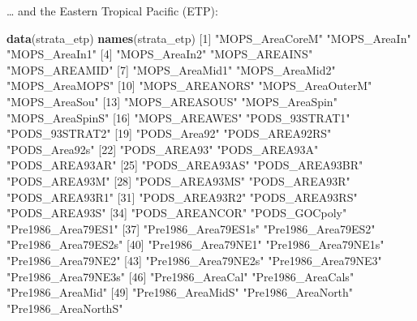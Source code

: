 \documentclass[
]{book}
\newenvironment{Shaded}{\begin{snugshade}}{\end{snugshade}}
\newcommand{\DecValTok}[1]{\textcolor[rgb]{0.00,0.00,0.81}{#1}}
\newcommand{\FunctionTok}[1]{\textcolor[rgb]{0.13,0.29,0.53}{\textbf{#1}}}
\newcommand{\NormalTok}[1]{#1}
\newcommand{\StringTok}[1]{\textcolor[rgb]{0.31,0.60,0.02}{#1}}
\begin{document}
\ldots{} and the Eastern Tropical Pacific (ETP):

\begin{Shaded}
\begin{Highlighting}[]
\FunctionTok{data}\NormalTok{(strata\_etp) }
\FunctionTok{names}\NormalTok{(strata\_etp)}
\NormalTok{ [}\DecValTok{1}\NormalTok{] }\StringTok{"MOPS\_AreaCoreM"}     \StringTok{"MOPS\_AreaIn"}        \StringTok{"MOPS\_AreaIn1"}      
\NormalTok{ [}\DecValTok{4}\NormalTok{] }\StringTok{"MOPS\_AreaIn2"}       \StringTok{"MOPS\_AREAINS"}       \StringTok{"MOPS\_AREAMID"}      
\NormalTok{ [}\DecValTok{7}\NormalTok{] }\StringTok{"MOPS\_AreaMid1"}      \StringTok{"MOPS\_AreaMid2"}      \StringTok{"MOPS\_AreaMOPS"}     
\NormalTok{[}\DecValTok{10}\NormalTok{] }\StringTok{"MOPS\_AREANORS"}      \StringTok{"MOPS\_AreaOuterM"}    \StringTok{"MOPS\_AreaSou"}      
\NormalTok{[}\DecValTok{13}\NormalTok{] }\StringTok{"MOPS\_AREASOUS"}      \StringTok{"MOPS\_AreaSpin"}      \StringTok{"MOPS\_AreaSpinS"}    
\NormalTok{[}\DecValTok{16}\NormalTok{] }\StringTok{"MOPS\_AREAWES"}       \StringTok{"PODS\_93STRAT1"}      \StringTok{"PODS\_93STRAT2"}     
\NormalTok{[}\DecValTok{19}\NormalTok{] }\StringTok{"PODS\_Area92"}        \StringTok{"PODS\_AREA92RS"}      \StringTok{"PODS\_Area92s"}      
\NormalTok{[}\DecValTok{22}\NormalTok{] }\StringTok{"PODS\_AREA93"}        \StringTok{"PODS\_AREA93A"}       \StringTok{"PODS\_AREA93AR"}     
\NormalTok{[}\DecValTok{25}\NormalTok{] }\StringTok{"PODS\_AREA93AS"}      \StringTok{"PODS\_AREA93BR"}      \StringTok{"PODS\_AREA93M"}      
\NormalTok{[}\DecValTok{28}\NormalTok{] }\StringTok{"PODS\_AREA93MS"}      \StringTok{"PODS\_AREA93R"}       \StringTok{"PODS\_AREA93R1"}     
\NormalTok{[}\DecValTok{31}\NormalTok{] }\StringTok{"PODS\_AREA93R2"}      \StringTok{"PODS\_AREA93RS"}      \StringTok{"PODS\_AREA93S"}      
\NormalTok{[}\DecValTok{34}\NormalTok{] }\StringTok{"PODS\_AREANCOR"}      \StringTok{"PODS\_GOCpoly"}       \StringTok{"Pre1986\_Area79ES1"} 
\NormalTok{[}\DecValTok{37}\NormalTok{] }\StringTok{"Pre1986\_Area79ES1s"} \StringTok{"Pre1986\_Area79ES2"}  \StringTok{"Pre1986\_Area79ES2s"}
\NormalTok{[}\DecValTok{40}\NormalTok{] }\StringTok{"Pre1986\_Area79NE1"}  \StringTok{"Pre1986\_Area79NE1s"} \StringTok{"Pre1986\_Area79NE2"} 
\NormalTok{[}\DecValTok{43}\NormalTok{] }\StringTok{"Pre1986\_Area79NE2s"} \StringTok{"Pre1986\_Area79NE3"}  \StringTok{"Pre1986\_Area79NE3s"}
\NormalTok{[}\DecValTok{46}\NormalTok{] }\StringTok{"Pre1986\_AreaCal"}    \StringTok{"Pre1986\_AreaCals"}   \StringTok{"Pre1986\_AreaMid"}   
\NormalTok{[}\DecValTok{49}\NormalTok{] }\StringTok{"Pre1986\_AreaMidS"}   \StringTok{"Pre1986\_AreaNorth"}  \StringTok{"Pre1986\_AreaNorthS"}

\end{Highlighting}
\end{Shaded}
\end{document}
